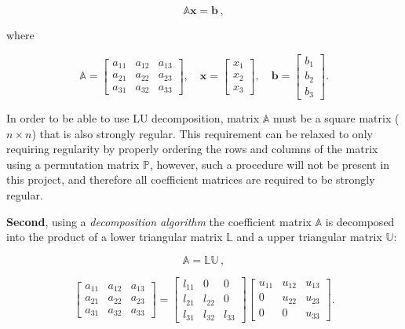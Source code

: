 \begin{equation}\label{Equation:LU-decomposition-system-linear-equations-matrix-form-Axb}
	\mathbb{A}\textbf{x} = \textbf{b}\,,
\end{equation}

where

\begin{equation}
	\mathbb{A} = 
	\begin{bmatrix}
		a_{11} & a_{12} & a_{13} \\
		a_{21} & a_{22} & a_{23} \\
		a_{31} & a_{32} & a_{33}
	\end{bmatrix}
	,\quad
	\mathbf{x} = 
	\begin{bmatrix}
		x_{1} \\
		x_{2} \\
		x_{3}
	\end{bmatrix}
	,\quad
	\mathbf{b} = 
	\begin{bmatrix}
		b_{1} \\
		b_{2} \\
		b_{3}
	\end{bmatrix}.
\end{equation}

In order to be able to use LU decomposition, matrix $ \mathbb{A} $ must be a square matrix ($ n\times n $) that is also strongly regular. This requirement can be relaxed to only requiring regularity by properly ordering the rows and columns of the matrix using a permutation matrix $ \mathbb{P} $, however, such a procedure will not be present in this project, and therefore all coefficient matrices are required to be strongly regular.
\par \textbf{Second}, using a \textit{decomposition algorithm} the coefficient matrix $ \mathbb{A} $ is decomposed into the product of a lower triangular matrix $ \mathbb{L} $ and a upper triangular matrix $ \mathbb{U} $:

\begin{equation}
	\mathbb{A} = \mathbb{LU}\,,
\end{equation}

\begin{equation}
	\begin{bmatrix}
		a_{11} & a_{12} & a_{13} \\
		a_{21} & a_{22} & a_{23} \\
		a_{31} & a_{32} & a_{33}
	\end{bmatrix}
	=
	\begin{bmatrix}
		l_{11} & 0      & 0          \\
		l_{21} & l_{22} & 0          \\
		l_{31} & l_{32} & l_{33}
	\end{bmatrix}
	\begin{bmatrix}
		u_{11} & u_{12} & u_{13} \\
		0      & u_{22} & u_{23} \\
		0      & 0      & u_{33}
	\end{bmatrix}.
\end{equation}

